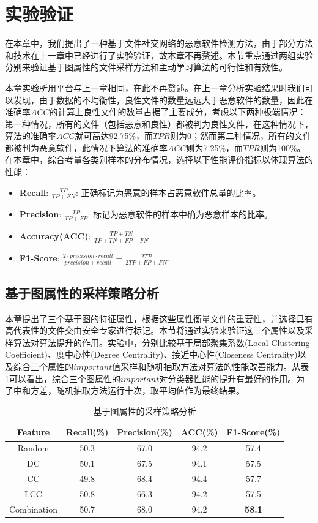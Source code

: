 \section{实验验证}
在本章中，我们提出了一种基于文件社交网络的恶意软件检测方法，由于部分方法和技术在上一章中已经进行了实验验证，故本章不再赘述。本节重点通过两组实验分别来验证基于图属性的文件采样方法和主动学习算法的可行性和有效性。

本章实验所用平台与上一章相同，在此不再赘述。在上一章分析实验结果时我们可以发现，由于数据的不均衡性，良性文件的数量远远大于恶意软件的数量，因此在准确率$ACC$的计算上良性文件的数量占据了主要成分，考虑以下两种极端情况：第一种情况，所有的文件（包括恶意和良性）都被判为良性文件，在这种情况下，算法的准确率$ACC$就可高达92.75\%，而$TPR$则为0；然而第二种情况，所有的文件都被判为恶意软件，此情况下算法的准确率$ACC$则为7.25\%，而$TPR$则为100\%。在本章中，综合考量各类别样本的分布情况，选择以下性能评价指标以体现算法的性能：
\begin{itemize}
\item \textbf{Recall}: $\frac {TP} {TP+FN}$: 正确标记为恶意的样本占恶意软件总量的比率。
\item \textbf{Precision}: $\frac {TP} {TP+FP}$: 标记为恶意软件的样本中确为恶意样本的比率。
\item \textbf{Accuracy(ACC)}: $\frac {TP+TN} {TP+TN+FP+FN}$
\item \textbf{F1-Score}: $\frac {2\cdot precision \cdot recall} {precision + recall} = \frac {2TP} {2TP+FP+FN}$.
\end{itemize}

\subsection{基于图属性的采样策略分析}
本章提出了三个基于图的特征属性，根据这些属性衡量文件的重要性，并选择具有高代表性的文件交由安全专家进行标记。本节将通过实验来验证这三个属性以及采样算法对算法提升的作用。实验中，分别比较基于局部聚集系数(Local Clustering Coefficient)、度中心性(Degree Centrality)、接近中心性(Closeness Centrality)以及综合三个属性的$important$值采样和随机抽取方法对算法的性能改善能力。从表\ref{tb_EvaGF}可以看出，综合三个图属性的$important$对分类器性能的提升有最好的作用。为了中和方差，随机抽取方法运行十次，取平均值作为最终结果。

\begin{table}[!ht]
\renewcommand{\arraystretch}{1.5}
\caption{基于图属性的采样策略分析}
\label{tb_EvaGF}
\centering
\begin{tabular}{ccccc}

\toprule
Feature & Recall(\%) & Precision(\%) & ACC(\%) & \textbf{F1-Score(\%)}\\
\midrule
Random & 50.3 & 67.0 & 94.2 & 57.4 \\
DC & 50.1 & 67.5 & 94.1 & 57.5 \\
CC & 49.8 & 68.4 & 94.4 & 57.7 \\
LCC & 50.8 & 66.3 & 94.2 & 57.5 \\
Combination & 50.7 & 68.0 & 94.2 & \textbf{58.1} \\
\bottomrule
\end{tabular}
\end{table}


